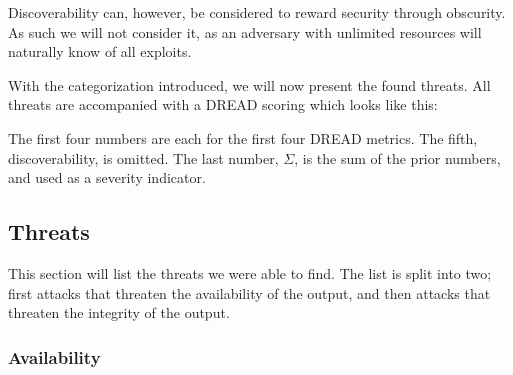 Discoverability can, however, be considered to reward security through obscurity. As such we will not consider it, as an adversary with unlimited resources will naturally know of all exploits.

With the categorization introduced, we will now present the found threats.
All threats are accompanied with a DREAD scoring which looks like this:

\begin{center}
\end{center}

The first four numbers are each for the first four DREAD metrics. The fifth, discoverability, is omitted. The last number, $\Sigma$, is the sum of the prior numbers, and used as a severity indicator.

\subsection{Threats}
This section will list the threats we were able to find. The list is split into two; first attacks that threaten the availability of the output, and then attacks that threaten the integrity of the output.

\subsubsection{Availability}

\newcommand{\parathreat}[1]{\paragraph{#1}\hspace{-1ex}}

